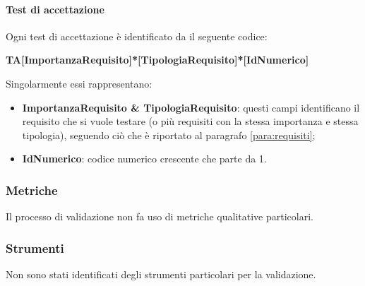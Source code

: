 \paragraph{Test di accettazione}
Ogni test di accettazione è identificato da il seguente codice:
\begin{center}
\textbf{TA[ImportanzaRequisito]*[TipologiaRequisito]*[IdNumerico]} 
\end{center}
Singolarmente essi rappresentano:
\begin{itemize}
	\item \textbf{ImportanzaRequisito \& TipologiaRequisito}: questi campi identificano il requisito che si vuole testare (o più requisiti con la stessa importanza e stessa tipologia), seguendo ciò che è riportato al paragrafo \ref{para:requisiti};
	\item \textbf{IdNumerico}: codice numerico crescente che parte da 1.
\end{itemize}


\subsubsection{Metriche}
Il processo di validazione non fa uso di metriche qualitative particolari.

\subsubsection{Strumenti}
Non sono stati identificati degli strumenti particolari per la validazione.

